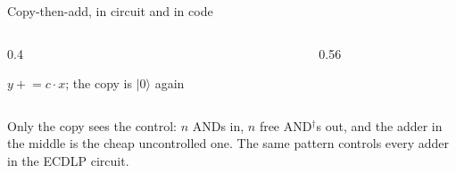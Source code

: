 \documentclass[aspectratio=169,11pt]{beamer}
\newcommand{\code}[2][]{}
\begin{document}
\begin{frame}[fragile]{Copy-then-add, in circuit and in code}
  \begin{columns}[c]
    \begin{column}{0.4\textwidth}
      \centering
      \par
      \vskip1mm
      {\scriptsize $y\mathrel{+}=c\cdot x$; the copy is $|0\rangle$ again}
    \end{column}
    \begin{column}{0.56\textwidth}
      \code[basicstyle=\ttfamily\scriptsize]{cadd.py}
    \end{column}
  \end{columns}
  \vskip3mm
  {\small Only the copy sees the control: $n$ ANDs in, $n$ free AND$^\dagger$s out, and the adder in the middle is the cheap uncontrolled one. The same pattern controls every adder in the ECDLP circuit.}
\end{frame}
\end{document}
